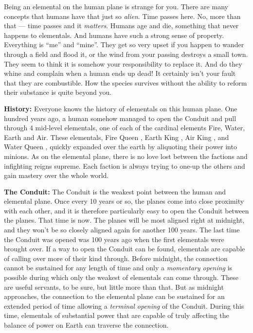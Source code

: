 \documentclass[blue]{elementals}
\begin{document}
\name{\bElemental{}}

Being an elemental on the human plane is strange for you. There are many concepts that humans have that just so \emph{alien}. Time passes here. No, more than that --- time passes and it \emph{matters}. Humans age and die, something that never happens to elementals. And humans have such a strong sense of property. Everything is ``me'' and ``mine''.  They get so very upset if you happen to wander through a field and flood it, or the wind from your passing destroys a small town. They seem to think it is somehow your responsibility to replace it. And do they whine and complain when a human ends up dead! It certainly isn't your fault that they are combustible. How the species survives without the ability to reform their substance is quite beyond you.

{\bf History:}
Everyone knows the history of elementals on this human plane. One hundred years ago, a human somehow managed to open the Conduit and pull through 4 mid-level elementals, one of each of the cardinal elements Fire, Water, Earth and Air. These elementals, Fire Queen \cQueen{}, Earth King \cEarthKing{}, Air King \cKing{}, and Water Queen \cWaterQueen{},  quickly expanded over the earth by aliquoting their power into minions. As on the elemental plane, there is no love lost between the factions and infighting reigns supreme. Each faction is always trying to one-up the others and gain mastery over the whole world.

{\bf The Conduit:}
The Conduit is the weakest point between the human and elemental plane. Once every 10 years or so, the planes come into close proximity with each other, and it is therefore particularly easy to open the Conduit between the planes. That time is now. The planes will be most aligned right at midnight, and they won't be so closely aligned again for another 100 years. The last time the Conduit was opened was 100 years ago when the first elementals were brought over. If a way to open the Conduit can be found, elementals are capable of calling over more of their kind through. Before midnight, the connection cannot be sustained for any length of time and only a \emph{momentary opening} is possible during which only the weakest of elementals can come through. These are useful servants, to be sure, but little more than that. But as midnight approaches, the connection to the elemental plane can be sustained for an extended period of time allowing a \emph{terminal opening} of the Conduit.  During this time, elementals of substantial power that are capable of truly affecting the balance of power on Earth can traverse the connection.
\end{document}
